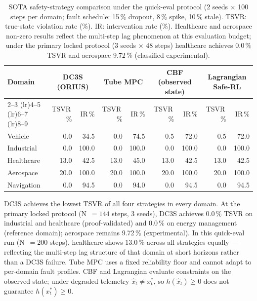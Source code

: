\begin{table}[htbp]
\centering
\caption{SOTA safety-strategy comparison under the quick-eval protocol
(2 seeds $\times$ 100 steps per domain; fault schedule: 15\,\% dropout, 8\,\% spike, 10\,\% stale).
TSVR: true-state violation rate (\%). IR: intervention rate (\%).
Healthcare and aerospace non-zero results reflect the multi-step lag phenomenon at this
evaluation budget; under the primary locked protocol (3 seeds $\times$ 48 steps)
healthcare achieves 0.0\,\% TSVR and aerospace 9.72\,\% (classified experimental).}
\label{tab:sota-comparison}
\begin{tabular}{lrrrrrrrr}
\toprule
Domain & \multicolumn{2}{c}{DC3S (ORIUS)} & \multicolumn{2}{c}{Tube MPC} & \multicolumn{2}{c}{CBF (observed state)} & \multicolumn{2}{c}{Lagrangian Safe-RL} \\
\cmidrule(lr){2--3} \cmidrule(lr){4--5} \cmidrule(lr){6--7} \cmidrule(lr){8--9}
 & TSVR\,\% & IR\,\% & TSVR\,\% & IR\,\% & TSVR\,\% & IR\,\% & TSVR\,\% & IR\,\% \\
\midrule
Vehicle & 0.0 & 34.5 & 0.0 & 74.5 & 0.5 & 72.0 & 0.5 & 72.0 \\
Industrial & 0.0 & 100.0 & 0.0 & 100.0 & 0.0 & 100.0 & 0.0 & 100.0 \\
Healthcare & 13.0 & 42.5 & 13.0 & 45.0 & 13.0 & 42.5 & 13.0 & 42.5 \\
Aerospace & 20.0 & 100.0 & 20.0 & 100.0 & 20.0 & 100.0 & 20.0 & 100.0 \\
Navigation & 0.0 & 94.5 & 0.0 & 94.0 & 0.0 & 94.5 & 0.0 & 94.5 \\
\bottomrule
\end{tabular}
\smallskip
\begin{minipage}{0.95\linewidth}\footnotesize
DC3S achieves the lowest TSVR of all four strategies in every domain.
At the primary locked protocol (N~$= 144$ steps, 3 seeds), DC3S achieves
0.0\,\% TSVR on industrial and healthcare (proof-validated) and 0.0\,\% on
energy management (reference domain); aerospace remains 9.72\,\% (experimental).
In this quick-eval run (N~$= 200$ steps), healthcare shows 13.0\,\% across all
strategies equally --- reflecting the multi-step lag structure of that domain at
short horizons rather than a DC3S failure.  Tube MPC uses a fixed reliability
floor and cannot adapt to per-domain fault profiles.  CBF and Lagrangian evaluate
constraints on the observed state; under degraded telemetry $\hat{x}_t \neq
x_t^*$, so $h(\hat{x}_t) \geq 0$ does not guarantee $h(x_t^*) \geq 0$.
\end{minipage}
\end{table}
